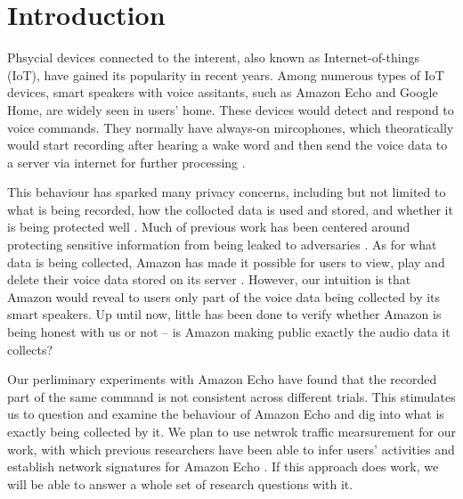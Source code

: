 \section{Introduction}
Phsycial devices connected to the interent, also known as Internet-of-things (IoT), have gained its popularity in recent years. Among numerous types of IoT devices, smart speakers with voice assitants, such as Amazon Echo and Google Home, are widely seen in users' home. These devices would detect and respond to voice commands. They normally have always-on mircophones, which theoratically would start recording after hearing a wake word and then send the voice data to a server via internet for further processing \cite{AmazonEc68:online}.

This behaviour has sparked many privacy concerns, including but not limited to what is being recorded, how the collocted data is used and stored, and whether it is being protected well \cite{lau2018alexa, fowler_2019, apthorpe2017smart, apthorpe2019keeping, apthorpe2017spying}. Much of previous work has been centered around protecting sensitive information from being leaked to adversaries \cite{apthorpe2017smart, apthorpe2019keeping, apthorpe2017spying}. As for what data is being collected, Amazon has made it possible for users to view, play and delete their voice data stored on its server \cite{ford2019alexa}. However, our intuition is that Amazon would reveal to users only part of the voice data being collected by its smart speakers. Up until now, little has been done to verify whether Amazon is being honest with us or not -- is Amazon making public exactly the audio data it collects?

Our perliminary experiments with Amazon Echo have found that the recorded part of the same command is not consistent across different trials. This stimulates us to question and examine the behaviour of Amazon Echo and dig into what is exactly being collected by it. We plan to use netwrok traffic mearsurement for our work, with which previous researchers have been able to infer users' activities \cite{apthorpe2017spying} and establish network signatures for Amazon Echo \cite{ford2019alexa}. If this approach does work, we will be able to answer a whole set of research questions with it.


